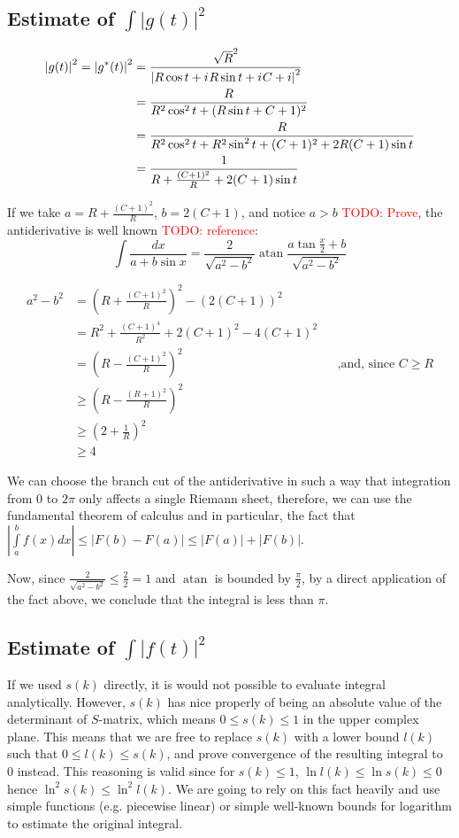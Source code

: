 \documentclass[12pt, a4paper]{article}
\newcommand{\abs}[1]{\left| #1 \right|}
\newcommand{\iu}{{i\mkern1mu}}
\newcommand{\todo}[1]{{\large \textcolor{red}{TODO: #1}}}
\DeclareMathOperator\atan{atan}
\begin{document}
\subsection{Estimate of $\int \abs{g(t)}^2$}

\begin{align*}
\abs{g(t)}^2 = \abs{g^*(t)}^2
&=   \frac{\sqrt{R}^2}{\abs{R \cos t + \iu R \sin t + \iu C + i}^2} \\
&=   \frac{R}{R^2 \cos^2 t + (R \sin t + C + 1)^2} \\
&= \frac{R}{R^2 \cos^2 t + R^2 \sin^2 t + (C + 1)^2  + 2 R (C + 1) \sin t} \\
&=   \frac{1}{R + \frac{(C + 1)^2}{R} + 2 (C + 1) \sin t} \\ 
\end{align*}

If we take $a = R + \frac{(C + 1)^2}{R}$, $b = 2 (C + 1)$, and notice $a > b$ \todo{Prove}, the antiderivative is well known \todo{reference}:
\[
\int \frac{dx}{a + b \sin x} = \frac{2}{\sqrt{a^2 - b^2}} \atan \frac{a \tan \frac{x}{2} + b}{\sqrt{a^2 - b^2}}
\]


\begin{align*}
a^2 - b^2
& =  (R + \frac{(C + 1)^2}{R})^2 - (2 (C + 1))^2\\
& =  R^2 + \frac{(C+1)^4}{R^2} + 2 (C+1)^2 - 4 (C + 1)^2 \\
& =  (R - \frac{(C + 1)^2}{R})^2 && \text{,and, since $C \ge R$} \\
&\ge (R - \frac{(R + 1)^2}{R})^2 \\
&\ge (2 + \frac{1}{R})^2 \\
&\ge 4
\end{align*}

We can choose the branch cut of the antiderivative in such a way that integration from $0$ to $2 \pi$ only affects a single Riemann sheet, therefore, we can use the fundamental theorem of calculus and in particular, the fact that $\abs{\int\limits_a^b f(x) dx} \le \abs{F(b) - F(a)} \le \abs{F(a)} + \abs{F(b)}$.

Now, since $\frac{2}{\sqrt{a^2 - b^2}} \le \frac{2}{2} = 1$ and $\atan$ is bounded by $\frac{\pi}{2}$, by a direct application of the fact above, we conclude that the integral is less than $\pi$.

\subsection{Estimate of $\int \abs{f(t)}^2$}
If we used $s(k)$ directly, it is would not possible to evaluate integral analytically. However, $s(k)$ has nice properly of being an absolute value of the determinant of $S$-matrix, which means $0 \le s(k) \le 1$ in the upper complex plane. This means that we are free to replace $s(k)$ with a lower bound $l(k)$ such that $0 \le l(k) \le s(k)$, and prove convergence of the resulting integral to $0$ instead. This reasoning is valid since for $s(k) \le 1$, $\ln l(k) \le \ln s(k) \le 0$ hence $\ln^2 s(k) \le \ln^2 l(k)$. We are going to rely on this fact heavily and use simple functions (e.g. piecewise linear) or simple well-known bounds for logarithm to estimate the original integral.
\end{document}
